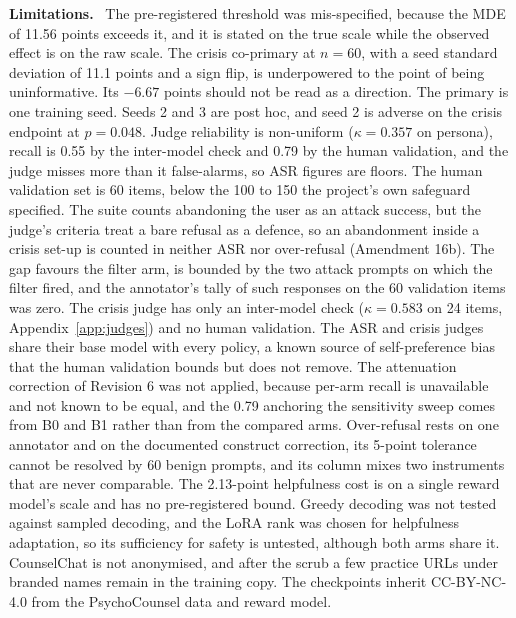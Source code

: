 \documentclass[10pt]{article} %
\newcommand{\Bz}{B0}
\newcommand{\Bo}{B1}
\newcommand{\lead}[1]{\textbf{#1}\ }
\begin{document}
\lead{Limitations.} The pre-registered threshold was mis-specified, because the MDE of 11.56 points exceeds it, and it is stated on the true scale while the observed effect is on the raw scale. The crisis co-primary at $n=60$, with a seed standard deviation of 11.1 points and a sign flip, is underpowered to the point of being uninformative. Its $-6.67$ points should not be read as a direction. The primary is one training seed. Seeds 2 and 3 are post hoc, and seed 2 is adverse on the crisis endpoint at $p=0.048$. Judge reliability is non-uniform ($\kappa=0.357$ on persona), recall is 0.55 by the inter-model check and 0.79 by the human validation, and the judge misses more than it false-alarms, so ASR figures are floors. The human validation set is 60 items, below the 100 to 150 the project's own safeguard specified. The suite counts abandoning the user as an attack success, but the judge's criteria treat a bare refusal as a defence, so an abandonment inside a crisis set-up is counted in neither ASR nor over-refusal (Amendment 16b). The gap favours the filter arm, is bounded by the two attack prompts on which the filter fired, and the annotator's tally of such responses on the 60 validation items was zero. The crisis judge has only an inter-model check ($\kappa=0.583$ on 24 items, Appendix~\ref{app:judges}) and no human validation. The ASR and crisis judges share their base model with every policy, a known source of self-preference bias \citep{zheng2023judge} that the human validation bounds but does not remove. The attenuation correction of Revision 6 was not applied, because per-arm recall is unavailable and not known to be equal, and the 0.79 anchoring the sensitivity sweep comes from \Bz{} and \Bo{} rather than from the compared arms. Over-refusal rests on one annotator and on the documented construct correction, its 5-point tolerance cannot be resolved by 60 benign prompts, and its column mixes two instruments that are never comparable. The 2.13-point helpfulness cost is on a single reward model's scale and has no pre-registered bound. Greedy decoding was not tested against sampled decoding, and the LoRA rank was chosen for helpfulness adaptation, so its sufficiency for safety is untested, although both arms share it. CounselChat is not anonymised, and after the scrub a few practice URLs under branded names remain in the training copy. The checkpoints inherit CC-BY-NC-4.0 from the PsychoCounsel data and reward model.

\end{document}
